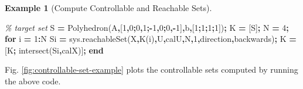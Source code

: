 \documentclass[
]{book}
\newenvironment{Shaded}{\begin{snugshade}}{\end{snugshade}}
\newcommand{\CommentTok}[1]{\textcolor[rgb]{0.56,0.35,0.01}{\textit{#1}}}
\newcommand{\FloatTok}[1]{\textcolor[rgb]{0.00,0.00,0.81}{#1}}
\newcommand{\KeywordTok}[1]{\textcolor[rgb]{0.13,0.29,0.53}{\textbf{#1}}}
\newcommand{\NormalTok}[1]{#1}
\newcommand{\OperatorTok}[1]{\textcolor[rgb]{0.81,0.36,0.00}{\textbf{#1}}}
\newcommand{\SpecialStringTok}[1]{\textcolor[rgb]{0.31,0.60,0.02}{#1}}
\newcommand{\VariableTok}[1]{\textcolor[rgb]{0.00,0.00,0.00}{#1}}
\theoremstyle{definition}
\theoremstyle{definition}
\newtheorem{example}{Example}[chapter]
\theoremstyle{definition}
\theoremstyle{definition}
\theoremstyle{remark}
\begin{document}
\begin{example}[Compute Controllable and Reachable Sets]
\begin{Shaded}
\begin{Highlighting}[]
\CommentTok{\% target set}
\VariableTok{S} \OperatorTok{=} \VariableTok{Polyhedron}\NormalTok{(}\SpecialStringTok{\textquotesingle{}A\textquotesingle{}}\OperatorTok{,}\NormalTok{[}\FloatTok{1}\OperatorTok{,}\FloatTok{0}\OperatorTok{;}\FloatTok{0}\OperatorTok{,}\FloatTok{1}\OperatorTok{;{-}}\FloatTok{1}\OperatorTok{,}\FloatTok{0}\OperatorTok{;}\FloatTok{0}\OperatorTok{,{-}}\FloatTok{1}\NormalTok{]}\OperatorTok{,}\SpecialStringTok{\textquotesingle{}b\textquotesingle{}}\OperatorTok{,}\NormalTok{[}\FloatTok{1}\OperatorTok{;}\FloatTok{1}\OperatorTok{;}\FloatTok{1}\OperatorTok{;}\FloatTok{1}\NormalTok{])}\OperatorTok{;}
\VariableTok{K} \OperatorTok{=}\NormalTok{ [}\VariableTok{S}\NormalTok{]}\OperatorTok{;}
\VariableTok{N} \OperatorTok{=} \FloatTok{4}\OperatorTok{;}
\KeywordTok{for} \VariableTok{i} \OperatorTok{=} \FloatTok{1}\OperatorTok{:}\VariableTok{N}
    \VariableTok{Si} \OperatorTok{=} \VariableTok{sys}\NormalTok{.}\VariableTok{reachableSet}\NormalTok{(}\SpecialStringTok{\textquotesingle{}X\textquotesingle{}}\OperatorTok{,}\VariableTok{K}\NormalTok{(}\VariableTok{i}\NormalTok{)}\OperatorTok{,}\SpecialStringTok{\textquotesingle{}U\textquotesingle{}}\OperatorTok{,}\VariableTok{calU}\OperatorTok{,}\SpecialStringTok{\textquotesingle{}N\textquotesingle{}}\OperatorTok{,}\FloatTok{1}\OperatorTok{,}\SpecialStringTok{\textquotesingle{}direction\textquotesingle{}}\OperatorTok{,}\SpecialStringTok{\textquotesingle{}backwards\textquotesingle{}}\NormalTok{)}\OperatorTok{;}
    \VariableTok{K} \OperatorTok{=}\NormalTok{ [}\VariableTok{K}\OperatorTok{;} \VariableTok{intersect}\NormalTok{(}\VariableTok{Si}\OperatorTok{,}\VariableTok{calX}\NormalTok{)]}\OperatorTok{;}
\KeywordTok{end}
\end{Highlighting}
\end{Shaded}

Fig. \ref{fig:controllable-set-example} plots the controllable sets computed by running the above code.

\begin{figure}


\end{figure}
\end{example}
\end{document}

